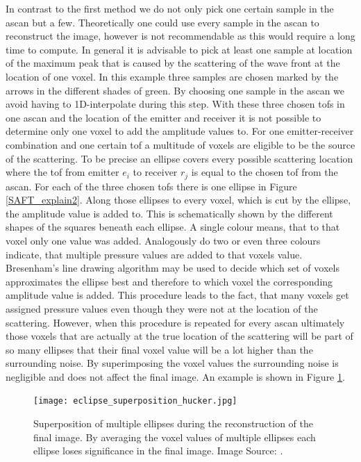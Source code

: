 In contrast to the first method we do not only pick one certain sample in the \ac{ascan} but a few. 
Theoretically one could use every sample in the \ac{ascan} to reconstruct the image, however is not recommendable as this would require a long time to compute. In general it is advisable to pick at least one sample at location of the maximum peak that is caused by the scattering of the wave front at the location of one voxel. In this example three samples are chosen marked by the arrows in the different shades of green. By choosing one sample in the \ac{ascan} we avoid having to 1D-interpolate during this step.
With these three chosen \acp{tof} in one \ac{ascan} and the location of the emitter and receiver it is not possible to determine only one voxel to add the amplitude values to. For one emitter-receiver combination and one certain \ac{tof} a multitude of voxels are eligible to be the source of the scattering. To be precise an ellipse covers every possible scattering location where the \ac{tof} from emitter $e_i$ to receiver $r_j$ is equal to the chosen \ac{tof} from the \ac{ascan}. For each of the three chosen \acp{tof} there is one ellipse in Figure \ref{SAFT_explain2}. Along those ellipses to every voxel, which is cut by the ellipse, the amplitude value is added to. This is schematically shown by the different shapes of the squares beneath each ellipse. A single colour means, that to that voxel only one value was added. Analogously do two or even three colours indicate, that multiple pressure values are added to that voxels value. 
Bresenham's line drawing algorithm \cite{Bresenham2010AlgorithmPlotter} may be used to decide which set of voxels approximates the ellipse best and therefore to which voxel the corresponding amplitude value is added.
This procedure leads to the fact, that many voxels get assigned pressure values even though they were not at the location of the scattering. However, when this procedure is repeated for every \ac{ascan} ultimately those voxels that are actually at the true location of the scattering will be part of so many ellipses that their final voxel value will be a lot higher than the surrounding noise. By superimposing the voxel values the surrounding noise is negligible and does not affect the final image. An example is shown in Figure \ref{eclipse_super}.


\begin{figure}[H]
    \centering
    \texttt{[image: eclipse\_superposition\_hucker.jpg]}
    \caption{ Superposition of multiple ellipses during the reconstruction of the final image. By averaging the voxel values of multiple ellipses each ellipse loses significance in the final image.
    Image Source: \cite{PatrickHucker2014EvaluationRuckstreumodells}.}
    \label{eclipse_super}
\end{figure}


